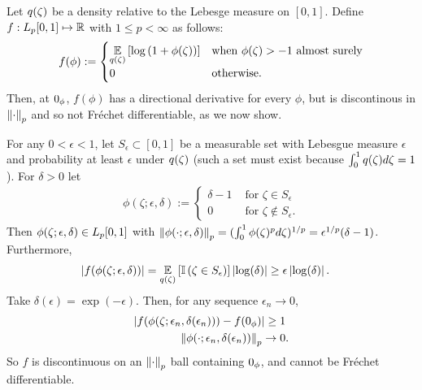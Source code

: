 \begin{ex}
%
Let $q(\zeta)$ be a density relative to the Lebesge measure on $[0,1]$.
Define $f: {L_{p}[0,1]} \mapsto \mathbb{R}$ with $1 \le p < \infty$ as follows:
%
\begin{align*}
%
f(\phi) :=
\begin{cases}
    \expect{\q(\zeta)}{\log \left(1 + \phi(\zeta)\right)} &
    \textrm{when }\phi(\zeta) > -1\textrm{ almost surely} \\
    0 & \textrm{otherwise}.
%
\end{cases}
%
\end{align*}
%
Then, at $0_\phi$,  $f(\phi)$ has a directional derivative for every $\phi$, but
is discontinous in $\left\Vert\cdot\right\Vert_p$ and so not Fr{\'e}chet differentiable, as
we now show.

For any $0 < \epsilon < 1$, let $S_\epsilon \subset [0, 1]$ be a measurable set
with Lebesgue measure $\epsilon$ and probability at least $\epsilon$ under
$q(\zeta)$ (such a set must exist because $\int_0^1 q(\zeta) d\zeta = 1$). For
$\delta > 0$ let
%
\begin{align*}
%
\phi(\zeta; \epsilon, \delta) :=
\begin{cases}
    \delta - 1      & \textrm{ for }\zeta\in S_\epsilon \\
    0      & \textrm{ for }\zeta\notin S_\epsilon.
\end{cases}
%
\end{align*}
%
Then $\phi(\zeta; \epsilon, \delta) \in {L_{p}[0,1]}$ with $\left\Vert\phi(\cdot;
\epsilon, \delta)\right\Vert_p = (\int_0^1 \phi(\zeta)^p d\zeta)^{1/p} =\epsilon^{1/p}
(\delta - 1)$.  Furthermore,
%
\begin{align*}
%
\abs{f(\phi(\zeta; \epsilon, \delta))} ={}&
    \expect{\q(\zeta)}{\ind{\zeta \in S_\epsilon}} \abs{\log(\delta)} \ge
    \epsilon \abs{\log(\delta)}.
%
\end{align*}
Take $\delta(\epsilon) = \exp(-\epsilon)$.  Then, for any sequence $\epsilon_n
\rightarrow 0$,
%
\begin{align*}
%
\abs{f(\phi(\zeta; \epsilon_n, \delta(\epsilon_n))) - f(\phiz)} \ge{}& 1\\
\norm{\phi(\cdot; \epsilon_n, \delta(\epsilon_n))}_p \rightarrow{}& 0.
%
\end{align*}
%
So $f$ is discontinuous on an $\left\Vert\cdot\right\Vert_p$ ball containing $0_\phi$, and
cannot be Fr{\'e}chet differentiable.


\end{ex}
